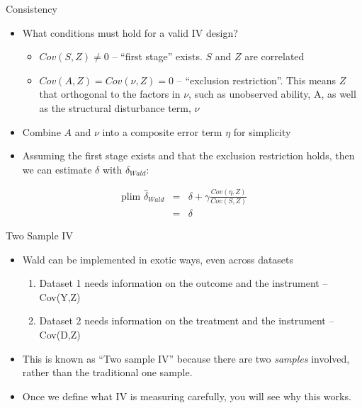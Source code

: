 \documentclass{beamer}
\begin{document}
\begin{frame}{Consistency}

	\begin{itemize}
	\item What conditions must hold for a valid IV design?
		\begin{itemize}
		\item  $Cov(S,Z)\neq{0}$ -- ``first stage'' exists.  $S$ and $Z$ are correlated 
		\item $Cov(A,Z)=Cov(\nu ,Z)=0$ -- ``exclusion restriction''.  This means $Z$ that orthogonal to the factors in $\nu$, such as unobserved ability, A, as well as the structural disturbance term, $\nu$
		\end{itemize}
	\item Combine $A$ and $\nu$ into a composite error term $\eta$ for simplicity
	\item Assuming the first stage exists and that the exclusion restriction holds, then we can estimate $\delta$ with $\delta_{Wald}$:
	\end{itemize}
	\begin{eqnarray*}
	\text{plim }\widehat{\delta}_{Wald}&=& \delta + \gamma \frac{Cov(\eta,Z)}{Cov(S,Z)} \\
	&=&\delta
	\end{eqnarray*}
\end{frame}









\begin{frame}{Two Sample IV}

	\begin{itemize}
	\item Wald can be implemented in exotic ways, even across datasets
		\begin{enumerate}
		\item Dataset 1 needs information on the outcome and the instrument -- Cov(Y,Z)
		\item Dataset 2 needs  information on the treatment and the instrument -- Cov(D,Z)
		\end{enumerate}
	\item This is known as ``Two sample IV'' because there are two \emph{samples} involved, rather than the traditional one sample.
	\item Once we define what IV is measuring carefully, you will see why this works.
	\end{itemize}
\end{frame}
\end{document}
